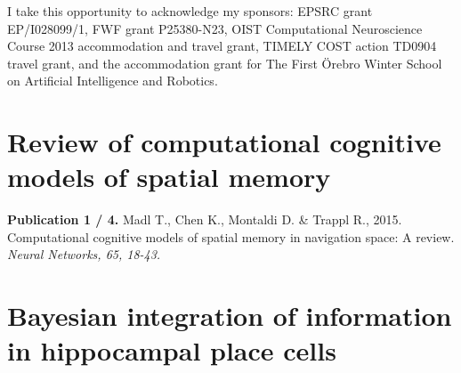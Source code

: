 \documentclass[12pt,PhD,twoside]{muthesis}
\begin{document}
I take this opportunity to acknowledge my sponsors: EPSRC grant EP/I028099/1, FWF grant P25380-N23, OIST Computational Neuroscience Course 2013 accommodation and travel grant, TIMELY COST action TD0904 travel grant, and the accommodation grant for The First {\"O}rebro Winter School on Artificial Intelligence and Robotics. 



\afterpreface






 

\chapter{Review of computational cognitive models of spatial memory}
\label{cha:nnreview}

\textbf{Publication 1 / 4.} Madl T., Chen K., Montaldi D. \& Trappl R., 2015. Computational cognitive models of spatial memory in navigation space: A review. \textit{Neural Networks, 65, 18-43.}

\newpage

\addtocounter{page}{-1}



\addtocounter{page}{-25}

\chapter{Bayesian integration of information in hippocampal place cells}
\label{cha:bayespc}
\end{document}
